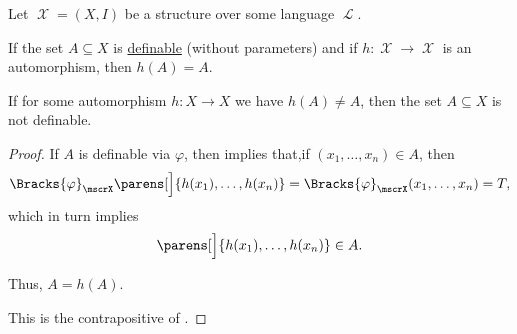 \begin{proposition}\label{thm:automorphism_of_definable_set}
  Let \( \mscrX = (X, I) \) be a structure over some language \( \mscrL \).

  \begin{thmenum}
     If the set \( A \subseteq X \) is \hyperref[def:first_order_definability]{definable} (without parameters) and if \( h: \mscrX \to \mscrX \) is an automorphism, then \( h(A) = A \).

     If for some automorphism \( h: X \to X \) we have \( h(A) \neq A \), then the set \( A \subseteq X \) is not definable.
  \end{thmenum}
\end{proposition}
\begin{proof}
   If \( A \) is definable via \( \varphi \), then  implies that,if \( (x_1, \ldots, x_n) \in A \), then
  \begin{equation*}
    \Bracks{\varphi}_\mscrX\parens[\Big]{ h(x_1), \ldots, h(x_n) } = \Bracks{\varphi}_\mscrX(x_1, \ldots, x_n) = T,
  \end{equation*}
  which in turn implies
  \begin{equation*}
    \parens[\Big]{ h(x_1), \ldots, h(x_n) } \in A.
  \end{equation*}

  Thus, \( A = h(A) \).

   This is the contrapositive of .
\end{proof}
